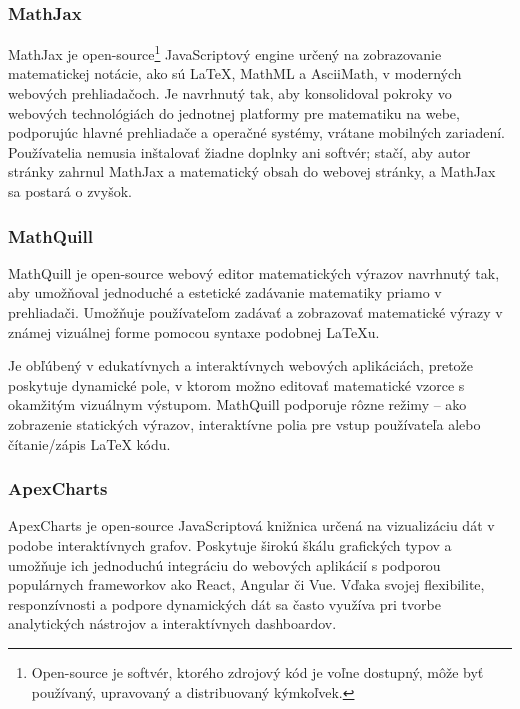 \subsubsection{MathJax}
MathJax \cite{MathJax} je open-source\footnote{Open-source je softvér, ktorého zdrojový kód je voľne dostupný, môže byť používaný, upravovaný a distribuovaný kýmkoľvek.} JavaScriptový engine určený na zobrazovanie matematickej notácie, ako sú LaTeX, MathML a AsciiMath, v moderných webových prehliadačoch.
Je navrhnutý tak, aby konsolidoval pokroky vo webových technológiách do jednotnej platformy pre matematiku na webe, podporujúc hlavné prehliadače a operačné systémy, vrátane mobilných zariadení.
Používatelia nemusia inštalovať žiadne doplnky ani softvér; stačí, aby autor stránky zahrnul MathJax a matematický obsah do webovej stránky, a MathJax sa postará o zvyšok.


  \subsubsection{MathQuill}
  MathQuill \cite{mathquill} je open-source webový editor matematických výrazov navrhnutý tak, aby umožňoval jednoduché a estetické zadávanie matematiky priamo v prehliadači. 
  Umožňuje používateľom zadávať a zobrazovať matematické výrazy v známej vizuálnej forme pomocou syntaxe podobnej LaTeXu.

Je obľúbený v edukatívnych a interaktívnych webových aplikáciách, pretože poskytuje dynamické pole, v ktorom možno editovať matematické vzorce s okamžitým vizuálnym výstupom. 
MathQuill podporuje rôzne režimy – ako zobrazenie statických výrazov, interaktívne polia pre vstup používateľa alebo čítanie/zápis LaTeX kódu.
\subsubsection{ApexCharts}
ApexCharts\cite{apexcharts} je open-source JavaScriptová knižnica určená na vizualizáciu dát v podobe interaktívnych grafov.
 Poskytuje širokú škálu grafických typov a umožňuje ich jednoduchú integráciu do webových aplikácií s podporou populárnych frameworkov ako React, Angular či Vue. 
Vďaka svojej flexibilite, responzívnosti a podpore dynamických dát sa často využíva pri tvorbe analytických nástrojov a interaktívnych dashboardov.

